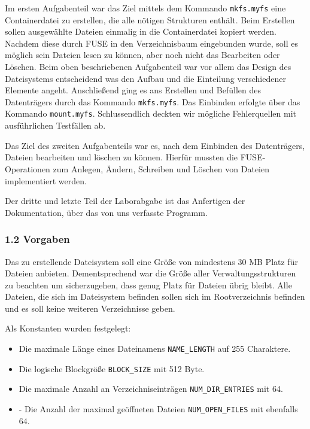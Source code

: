 \documentclass[]{article}
\providecommand{\tightlist}{%
  \setlength{\itemsep}{0pt}\setlength{\parskip}{0pt}}
\begin{document}
Im ersten Aufgabenteil war das Ziel mittels dem Kommando
\texttt{mkfs.myfs} eine Containerdatei zu erstellen, die alle nötigen
Strukturen enthält. Beim Erstellen sollen ausgewählte Dateien einmalig
in die Containerdatei kopiert werden. Nachdem diese durch FUSE in den
Verzeichnisbaum eingebunden wurde, soll es möglich sein Dateien lesen zu
können, aber noch nicht das Bearbeiten oder Löschen. Beim oben
beschriebenen Aufgabenteil war vor allem das Design des Dateisystems
entscheidend was den Aufbau und die Einteilung verschiedener Elemente
angeht. Anschließend ging es ans Erstellen und Befüllen des Datenträgers
durch das Kommando \texttt{mkfs.myfs}. Das Einbinden erfolgte über das
Kommando \texttt{mount.myfs}. Schlussendlich deckten wir mögliche
Fehlerquellen mit ausführlichen Testfällen ab.

Das Ziel des zweiten Aufgabenteils war es, nach dem Einbinden des
Datenträgers, Dateien bearbeiten und löschen zu können. Hierfür mussten
die FUSE-Operationen zum Anlegen, Ändern, Schreiben und Löschen von
Dateien implementiert werden.

Der dritte und letzte Teil der Laborabgabe ist das Anfertigen der
Dokumentation, über das von uns verfasste Programm.

\hypertarget{vorgaben}{%
\subsubsection{1.2 Vorgaben}\label{vorgaben}}

Das zu erstellende Dateisystem soll eine Größe von mindestens 30 MB
Platz für Dateien anbieten. Dementsprechend war die Größe aller
Verwaltungsstrukturen zu beachten um sicherzugehen, dass genug Platz für
Dateien übrig bleibt. Alle Dateien, die sich im Dateisystem befinden
sollen sich im Rootverzeichnis befinden und es soll keine weiteren
Verzeichnisse geben.

Als Konstanten wurden festgelegt: 
\begin{itemize}
  \tightlist
  \item
    Die maximale Länge eines Dateinamens \texttt{NAME\_LENGTH} auf 255 Charaktere. 
  \item 
    Die logische Blockgröße \texttt{BLOCK\_SIZE} mit 512 Byte. 
  \item 
    Die maximale Anzahl an Verzeichniseinträgen \texttt{NUM\_DIR\_ENTRIES} mit 64. 
  \item   
  - Die Anzahl der maximal geöffneten Dateien \texttt{NUM\_OPEN\_FILES} mit ebenfalls 64.
\end{itemize}
\end{document}

